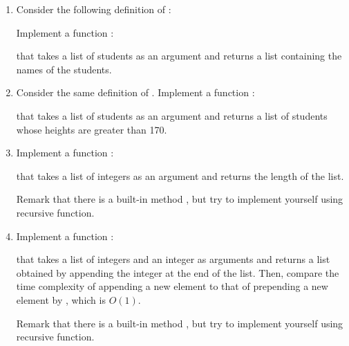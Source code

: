 \begin{enumerate}
  \item Consider the following definition of :


    Implement a function :


    that takes a list of students as an argument
    and returns a list containing the names of the students.

  \item Consider the same definition of .
    Implement a function :


    that takes a list of students as an argument
    and returns a list of students whose heights are greater than 170.

  \item
    Implement a function :


    that takes a list of integers as an argument
    and returns the length of the list.

    Remark that there is a built-in method , but try to implement
    yourself using recursive function.

  \item
    Implement a function :


    that takes a list of integers and an integer as arguments
    and returns a list obtained by appending the integer at the end of the list.
    Then, compare the time complexity of appending a new element to that of
    prepending a new element by \code{::}, which is $O(1)$.

    Remark that there is a built-in method , but try to implement
    yourself using recursive function.

\end{enumerate}
